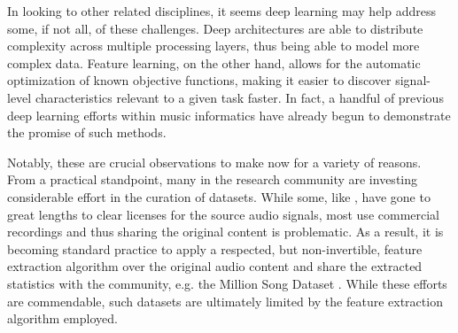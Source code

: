 In looking to other related disciplines, it seems deep learning may help address some, if not all, of these challenges.
Deep architectures are able to distribute complexity across multiple processing layers, thus being able to model more complex data.
Feature learning, on the other hand, allows for the automatic optimization of known objective functions, making it easier to discover signal-level characteristics relevant to a given task faster.
In fact, a handful of previous deep learning efforts within music informatics have already begun to demonstrate the promise of such methods.

Notably, these are crucial observations to make now for a variety of reasons.
From a practical standpoint, many in the research community are investing considerable effort in the curation of datasets.
While some, like \cite{medley}, have gone to great lengths to clear licenses for the source audio signals, most use commercial recordings and thus sharing the original content is problematic.
As a result, it is becoming standard practice to apply a respected, but non-invertible, feature extraction algorithm over the original audio content and share the extracted statistics with the community, e.g. the Million Song Dataset \cite{BertinMahieux2014}.
While these efforts are commendable, such datasets are ultimately limited by the feature extraction algorithm employed.
